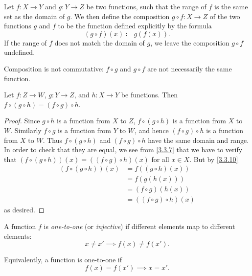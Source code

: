 \setcounter{thm}{9}
\begin{defn}[Composition]\label{3.3.10}
  Let \(f : X \to Y\) and \(g : Y \to Z\) be two functions, such that the range of \(f\) is the same set as the domain of \(g\).
  We then define the composition \(g \circ f : X \to Z\) of the two functions \(g\) and \(f\) to be the function defined explicitly by the formula
  \[
    (g \circ f)(x) \coloneqq g(f(x)).
  \]
  If the range of \(f\) does not match the domain of \(g\), we leave the composition \(g \circ f\) undefined.
\end{defn}

\begin{note}
  Composition is not commutative: \(f \circ g\) and \(g \circ f\) are not necessarily the same function.
\end{note}

\setcounter{thm}{11}
\begin{lem}\label{3.3.12}
  Let \(f : Z \to W\), \(g : Y \to Z\), and \(h : X \to Y\) be functions.
  Then \(f \circ (g \circ h) = (f \circ g) \circ h\).
\end{lem}

\begin{proof}
  Since \(g \circ h\) is a function from \(X\) to \(Z\), \(f \circ (g \circ h)\) is a function from \(X\) to \(W\).
  Similarly \(f \circ g\) is a function from \(Y\) to \(W\), and hence \((f \circ g) \circ h\) is a function from \(X\) to \(W\).
  Thus \(f \circ (g \circ h)\) and \((f \circ g) \circ h\) have the same domain and range.
  In order to check that they are equal, we see from \cref{3.3.7} that we have to verify that \((f \circ (g \circ h))(x) = ((f \circ g) \circ h)(x)\) for all \(x \in X\).
  But by \cref{3.3.10}
  \begin{align*}
    (f \circ (g \circ h))(x)
     & = f((g \circ h)(x))        \\
     & = f(g(h(x)))               \\
     & = (f \circ g)(h(x))        \\
     & = ((f \circ g) \circ h)(x)
  \end{align*}
  as desired.
\end{proof}

\setcounter{thm}{13}
\begin{defn}\label{3.3.14}
  A function \(f\) is \emph{one-to-one} (or \emph{injective}) if different elements map to different elements:
  \[
    x \neq x' \implies f(x) \neq f(x').
  \]

  Equivalently, a function is one-to-one if
  \[
    f(x) = f(x') \implies x = x'.
  \]
\end{defn}


